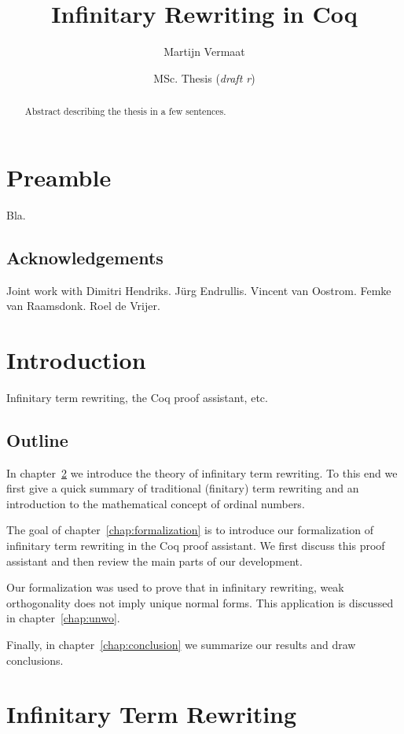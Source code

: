 \documentclass[11pt,oneside,a4paper,final]{report}
\title{Infinitary Rewriting in Coq}
\author{Martijn Vermaat}
\date{MSc. Thesis (\emph{draft r\svnrev})}
\theoremstyle{definition}
\begin{document}
\maketitle


\begin{abstract}
  Abstract describing the thesis in a few sentences.
\end{abstract}


\chapter*{Preamble}

Bla.


\section*{Acknowledgements}

Joint work with Dimitri Hendriks.
J\"urg Endrullis.
Vincent van Oostrom.
Femke van Raamsdonk.
Roel de Vrijer.


\tableofcontents


\chapter{Introduction}

Infinitary term rewriting, the Coq proof assistant, etc.


\section*{Outline}

In chapter~\ref{chap:itr} we introduce the theory of infinitary term
rewriting. To this end we first give a quick summary of traditional (finitary)
term rewriting and an introduction to the mathematical concept of ordinal
numbers.

The goal of chapter~\ref{chap:formalization} is to introduce our formalization
of infinitary term rewriting in the Coq proof assistant. We first discuss this
proof assistant and then review the main parts of our development.

Our formalization was used to prove that in infinitary rewriting, weak
orthogonality does not imply unique normal forms. This application is
discussed in chapter~\ref{chap:unwo}.

Finally, in chapter~\ref{chap:conclusion} we summarize our results and draw
conclusions.


\chapter{Infinitary Term Rewriting}\label{chap:itr}
\end{document}
